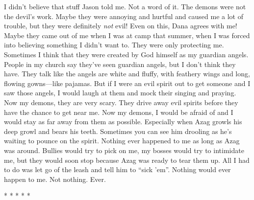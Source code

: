 I didn't believe that stuff Jason told me. Not a word of it. The demons
were not the devil's work. Maybe they were annoying and hurtful and
caused me a lot of trouble, but they were definitely \emph{not} evil!
Even on this, Dana agrees with me! Maybe they came out of me when I was
at camp that summer, when I was forced into believing something I didn't
want to. They were only protecting me. Sometimes I think that they were
created by God himself as my guardian angels. People in my church say
they've seen guardian angels, but I don't think they have. They talk
like the angels are white and fluffy, with feathery wings and long,
flowing gowns---like pajamas. But if I were an evil spirit out to get
someone and I saw those angels, I would laugh at them and mock their
singing and praying. Now my demons, they are very scary. They drive away
evil spirits before they have the chance to get near me. Now my demons,
I would be afraid of and I would stay as far away from them as possible.
Especially when Azag growls his deep growl and bears his teeth.
Sometimes you can see him drooling as he's waiting to pounce on the
spirit. Nothing ever happened to me as long as Azag was around. Bullies
would try to pick on me, my bosses would try to intimidate me, but they
would soon stop because Azag was ready to tear them up. All I had to do
was let go of the leash and tell him to ``sick 'em''. Nothing would ever
happen to me. Not nothing. Ever.

* * * * *


